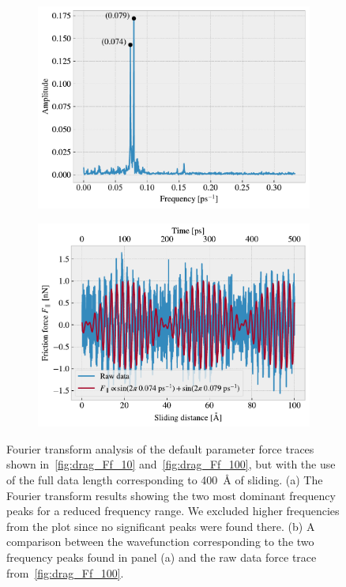 \begin{figure}[!htb]
  \centering
  \begin{subfigure}[t]{0.49\textwidth}
    \centering
    \includegraphics[width=\textwidth]{figures/baseline/ft_zoom.pdf}
    \caption{}
    \label{fig:ft_a}
  \end{subfigure}
  \hfill
  \begin{subfigure}[t]{0.49\textwidth}
      \centering
      \includegraphics[width=\textwidth]{figures/baseline/ft_sine.pdf}
      \caption{}
      \label{fig:ft_b}
  \end{subfigure}
  \caption{Fourier transform analysis of the default parameter force traces shown in~\cref{fig:drag_Ff_10} and~\cref{fig:drag_Ff_100}, but with the use of the full data length corresponding to \SI{400}{Å} of sliding. (a) The Fourier transform results showing the two most dominant frequency peaks for a reduced frequency range. We excluded higher frequencies from the plot since no significant peaks were found there. (b) A comparison between the wavefunction corresponding to the two frequency peaks found in panel (a) and the raw data force trace from~\cref{fig:drag_Ff_100}.}
  \label{fig:ft}
\end{figure}


